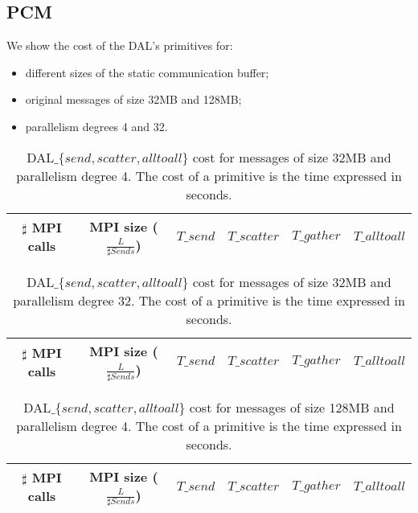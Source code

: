 \clearpage

\subsection*{PCM}
We show the cost of the DAL's primitives for:
\begin{itemize}
\item different sizes of the static communication buffer;
\item original messages of size 32MB and 128MB;
\item parallelism degrees 4 and 32.
\end{itemize} 

\begin{table}[h]
\begin{center}
\begin{tabular}{|c|c|c|c|c|c|}\hline
\hline
$\sharp$ MPI calls & MPI size ($\frac{L}{\sharp Sends}$)  & $T\_send$   & $T\_scatter$ & $T\_gather$ & $T\_alltoall$      \\\hline\hline

\end{tabular}
\caption{DAL$\_\lbrace send, scatter, alltoall \rbrace$ cost for messages of size 32MB and parallelism degree 4. The cost of a primitive is the time expressed in seconds.}
\label{tsetup-pcm-n4-M32}
\end{center}
\end{table}


\begin{table}[h]
\begin{center}
\begin{tabular}{|c|c|c|c|c|c|}\hline
\hline
$\sharp$ MPI calls & MPI size ($\frac{L}{\sharp Sends}$)  & $T\_send$   & $T\_scatter$  & $T\_gather$ & $T\_alltoall$      \\\hline\hline

\end{tabular}
\caption{DAL$\_\lbrace send, scatter, alltoall \rbrace$ cost for messages of size 32MB and parallelism degree 32. The cost of a primitive is the time expressed in seconds.}
\label{tsetup-pcm-n32-M32}
\end{center}
\end{table}

\begin{table}[h]
\begin{center}
\begin{tabular}{|c|c|c|c|c|c|}\hline
\hline
$\sharp$ MPI calls & MPI size ($\frac{L}{\sharp Sends}$)  & $T\_send$   & $T\_scatter$  & $T\_gather$ & $T\_alltoall$      \\\hline\hline

\end{tabular}
\caption{DAL$\_\lbrace send, scatter, alltoall \rbrace$ cost for messages of size 128MB and parallelism degree 4. The cost of a primitive is the time expressed in seconds.}
\label{tsetup-pcm-n4-M128}
\end{center}
\end{table}


